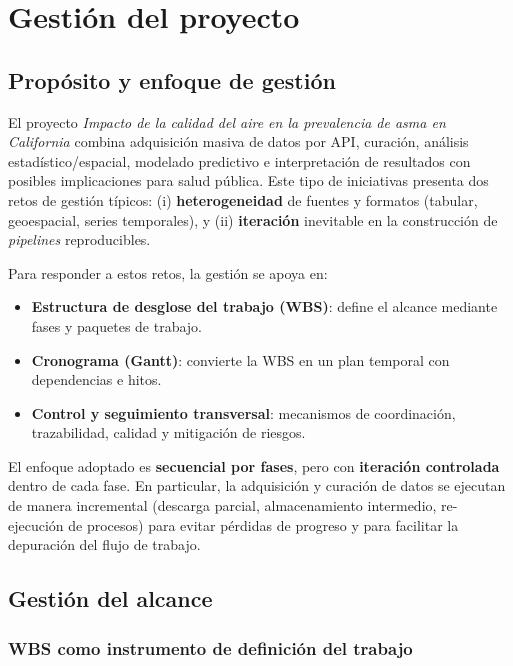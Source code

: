 \chapter{Gestión del proyecto}\label{ch:gestion_proyecto}

\section{Propósito y enfoque de gestión}\label{sec:proposito-y-enfoque-de-gestion}

El proyecto \textit{Impacto de la calidad del aire en la prevalencia de asma en California}
combina adquisición masiva de datos por API, curación, análisis estadístico/espacial, modelado
predictivo e interpretación de resultados con posibles implicaciones para salud pública.
Este tipo de iniciativas presenta dos retos de gestión típicos: (i) \textbf{heterogeneidad} de fuentes
y formatos (tabular, geoespacial, series temporales), y (ii) \textbf{iteración} inevitable en la
construcción de \emph{pipelines} reproducibles.

Para responder a estos retos, la gestión se apoya en:
\begin{itemize}
    \item \textbf{Estructura de desglose del trabajo (WBS)}: define el alcance mediante fases y paquetes de trabajo.
    \item \textbf{Cronograma (Gantt)}: convierte la WBS en un plan temporal con dependencias e hitos.
    \item \textbf{Control y seguimiento transversal}: mecanismos de coordinación, trazabilidad, calidad y mitigación de riesgos.
\end{itemize}

El enfoque adoptado es \textbf{secuencial por fases}, pero con \textbf{iteración controlada} dentro de cada fase.
En particular, la adquisición y curación de datos se ejecutan de manera incremental (descarga parcial,
almacenamiento intermedio, re-ejecución de procesos) para evitar pérdidas de progreso y para facilitar
la depuración del flujo de trabajo.

\section{Gestión del alcance}\label{sec:gestion-del-alcance}

\subsection{WBS como instrumento de definición del trabajo}\label{subsec:wbs-como-instrumento-de-definicion-del-trabajo}

